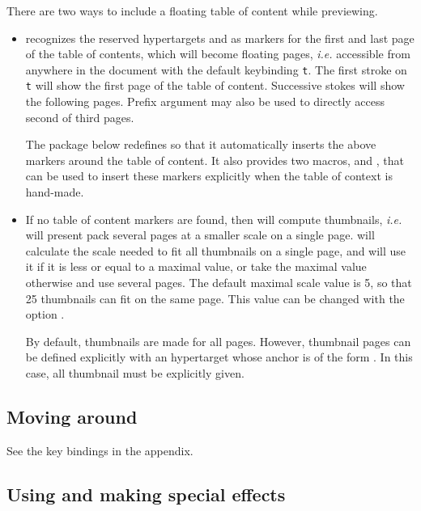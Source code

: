 \documentclass[12pt]{article}
\begin{document}
There are two ways to include a floating table of content while previewing. 
\begin {itemize}

\item
{\ActiveDVI} recognizes the reserved hypertargets 
and  as markers for the first and last page of the table
of contents, which will become floating pages, {\em i.e.} accessible from
anywhere in the document with the default keybinding \verb't'.
The first stroke on \verb't' will show the first page of the table of
content. Successive stokes will show the following pages. Prefix argument 
may also be used to directly access second of third pages. 

The package  below redefines
{\docdef \tableofcontents} so that it automatically inserts the above
markers around the table of content. It also provides two macros, {\docdef
\advitoc} and \docdef \endadvitoc, that can be used to insert these markers
explicitly when the table of context is hand-made.

\item
If no table of content markers are found, then {\ActiveDVI} will
compute thumbnails, {\em i.e.} will present pack several pages at a smaller 
scale on a single page. {\ActiveDVI} will calculate the scale needed to 
fit all thumbnails on a single page, and will use it if it is 
less or equal to a maximal value, or take the maximal value otherwise
and use several pages. The default maximal scale value is 5, so that
25 thumbnails can fit on the same page. This value can be changed with the
option .  

By default, thumbnails are made for all pages. However, thumbnail pages can
be defined explicitly with an hypertarget whose anchor is of the form
. In this case, all thumbnail must be explicitly
given.

\end {itemize}


\subsection {Moving around}

See the key bindings in the appendix.

\subsection {Using and making special effects}
\end{document}
